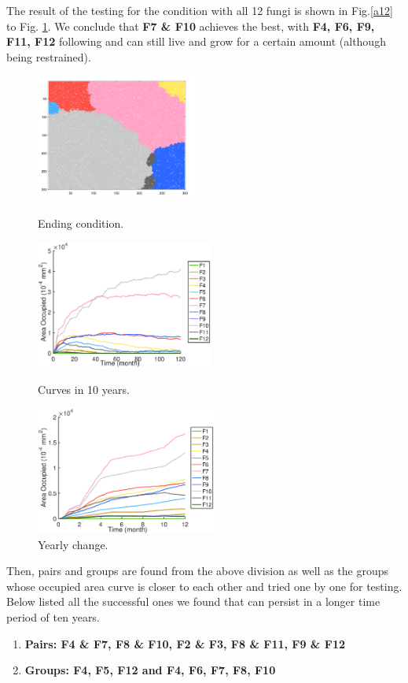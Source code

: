 \documentclass[a4paper,12pt]{article}
\begin{document}
The result of the testing for the condition with all 12 fungi is shown in Fig.\ref{a12} to Fig. \ref{ya12}. We conclude that \textbf{F7 \& F10 }achieves the best, with \textbf{F4, F6, F9, F11, F12} following and can still live and grow for a certain amount (although being restrained).
\begin{figure}[]
	\begin{minipage}{29ex}
	\includegraphics[height=4.2cm]{./formal/arid/12[3].png}
	\caption{Ending condition.}
	\label{a12}
\end{minipage}   
\begin{minipage}{31ex}
	\includegraphics[height=4.2cm]{./formal/arid/12.eps}
	\caption{Curves in 10 years.}
	\label{a}
\end{minipage}
\begin{minipage}{29ex}
 \quad
	\includegraphics[height=4.2cm]{./formal/arid/12[2].eps}
	\caption{Yearly change.}
	\label{ya12}
\end{minipage} 
\end{figure}

Then, pairs and groups are found from the above division as well as the groups whose occupied area curve is closer to each other and tried one by one for testing. Below listed all the successful ones we found that can persist in a longer time period of ten years.
\begin{enumerate}
\setlength{\itemsep}{0ex} %
\item \textbf{Pairs:  F4 \& F7, F8 \& F10, F2 \& F3, F8 \& F11, F9 \& F12}
\item \textbf{Groups: F4, F5, F12 and F4, F6, F7, F8, F10}
\end{enumerate}
\end{document}
